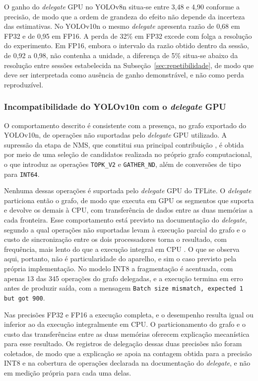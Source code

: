 \documentclass[artigo,times,capa]{iftex2024}
\begin{document}


O ganho do \textit{delegate} \ac{GPU} no YOLOv8n situa-se entre 3,48 e 4,90
conforme a precisão, de modo que a ordem de grandeza do efeito não depende da
incerteza das estimativas. No YOLOv10n o mesmo \textit{delegate} apresenta razão de 0,68 em \ac{FP32} e de 0,95 em \ac{FP16}. A perda de 32\% em \ac{FP32} excede com folga a resolução do experimento. Em \ac{FP16}, embora o intervalo da razão obtido dentro da sessão, de 0,92 a 0,98, não contenha a unidade, a diferença de 5\% situa-se abaixo da resolução entre sessões estabelecida na Subseção~\ref{sec:repetibilidade}, de modo que deve ser interpretada como ausência de ganho demonstrável, e não como perda reproduzível.

\subsubsection{Incompatibilidade do YOLOv10n com o \textit{delegate} GPU}
\label{sec:v10n_gpu}

O comportamento descrito é consistente com a presença, no grafo exportado do YOLOv10n, de operações não suportadas pelo \textit{delegate} \ac{GPU} utilizado. A supressão da etapa de \ac{NMS}, que constitui sua principal contribuição \cite{Wang2024YOLOv10}, é obtida por meio de uma seleção de candidatos realizada no próprio grafo computacional, o que introduz as operações \texttt{TOPK\_V2} e \texttt{GATHER\_ND}, além de conversões de tipo para \texttt{INT64}.

Nenhuma dessas operações é suportada pelo \textit{delegate} \ac{GPU} do \ac{TFLite}. O \textit{delegate} particiona então o grafo, de modo que executa em \ac{GPU} os segmentos que suporta e devolve os demais à \ac{CPU}, com transferência de dados entre as duas memórias a cada fronteira. Esse comportamento está previsto na documentação do \textit{delegate}, segundo a qual operações não suportadas levam à execução parcial do grafo e o custo de sincronização entre os dois processadores torna o resultado, com frequência, mais lento do que a execução integral em \ac{CPU} \cite{GoogleAIEdge2026GPU}. O que se observa aqui, portanto, não é particularidade do aparelho, e sim o caso previsto pela própria implementação. No modelo \ac{INT8} a fragmentação é acentuada, com apenas 13 das 345 operações do grafo delegadas, e a execução termina em erro antes de produzir saída, com a mensagem \texttt{Batch size mismatch, expected 1 but got 900}.

Nas precisões \ac{FP32} e \ac{FP16} a execução completa, e o desempenho resulta igual ou inferior ao da execução integralmente em \ac{CPU}. O particionamento do grafo e o custo das transferências entre as duas memórias oferecem explicação mecanística para esse resultado. Os registros de delegação dessas duas precisões não foram coletados, de modo que a explicação se apoia na contagem obtida para a precisão \ac{INT8} e na cobertura de operações declarada na documentação do \textit{delegate}, e não em medição própria para cada uma delas.
\end{document}
